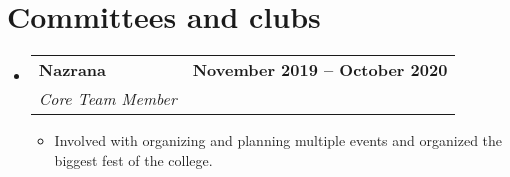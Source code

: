 \documentclass[letterpaper,11pt]{article}
\makeatletter
\newcommand{\resumeItem}[1]{
  \item\small{
    {#1 \vspace{-2pt}}
  }
}
\newcommand{\resumeSubheading}[4]{
  \vspace{-2pt}\item
    \begin{tabular*}{1.0\textwidth}[t]{l@{\extracolsep{\fill}}r}
      \vspace{-2pt}\textbf{#1} & \textbf{\small #2} \\
      \textit{\small#3} & \textit{\small #4} \\
    \end{tabular*}\vspace{-7pt}
}
\newcommand{\resumeSubHeadingListStart}{\begin{itemize}[leftmargin=0.0in, label={}]}
\newcommand{\resumeSubHeadingListEnd}{\end{itemize}}
\newcommand{\resumeItemListStart}{\begin{itemize}}
\newcommand{\resumeItemListEnd}{\end{itemize}\vspace{-5pt}}
\makeatother
\begin{document}
\vspace{-8pt}

\section{Committees and clubs}
    \vspace{-2pt}
    \resumeSubHeadingListStart
        \resumeSubheading
            {Nazrana}{November 2019 -- October 2020}
            {Core Team Member}{}
            \vspace{-7pt}
            \resumeItemListStart
                \resumeItem{Involved with organizing and planning multiple  events and organized the biggest fest of the college.}
            \resumeItemListEnd
            \vspace{-4pt}

    \resumeSubHeadingListEnd
\vspace{-12pt}
\end{document}
